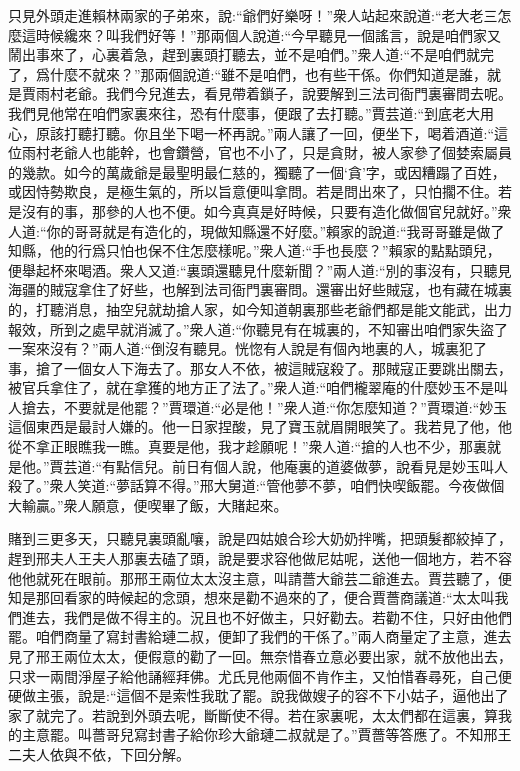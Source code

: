 \begin{parag}
    只見外頭走進賴林兩家的子弟來，說:“爺們好樂呀！”衆人站起來說道:“老大老三怎麼這時候纔來？叫我們好等！”那兩個人說道:“今早聽見一個謠言，說是咱們家又鬧出事來了，心裏着急，趕到裏頭打聽去，並不是咱們。”衆人道:“不是咱們就完了，爲什麼不就來？”那兩個說道:“雖不是咱們，也有些干係。你們知道是誰，就是賈雨村老爺。我們今兒進去，看見帶着鎖子，說要解到三法司衙門裏審問去呢。我們見他常在咱們家裏來往，恐有什麼事，便跟了去打聽。”賈芸道:“到底老大用心，原該打聽打聽。你且坐下喝一杯再說。”兩人讓了一回，便坐下，喝着酒道:“這位雨村老爺人也能幹，也會鑽營，官也不小了，只是貪財，被人家參了個婪索屬員的幾款。如今的萬歲爺是最聖明最仁慈的，獨聽了一個‘貪’字，或因糟蹋了百姓，或因恃勢欺良，是極生氣的，所以旨意便叫拿問。若是問出來了，只怕擱不住。若是沒有的事，那參的人也不便。如今真真是好時候，只要有造化做個官兒就好。”衆人道:“你的哥哥就是有造化的，現做知縣還不好麼。”賴家的說道:“我哥哥雖是做了知縣，他的行爲只怕也保不住怎麼樣呢。”衆人道:“手也長麼？”賴家的點點頭兒，便舉起杯來喝酒。衆人又道:“裏頭還聽見什麼新聞？”兩人道:“別的事沒有，只聽見海疆的賊寇拿住了好些，也解到法司衙門裏審問。還審出好些賊寇，也有藏在城裏的，打聽消息，抽空兒就劫搶人家，如今知道朝裏那些老爺們都是能文能武，出力報效，所到之處早就消滅了。”衆人道:“你聽見有在城裏的，不知審出咱們家失盜了一案來沒有？”兩人道:“倒沒有聽見。恍惚有人說是有個內地裏的人，城裏犯了事，搶了一個女人下海去了。那女人不依，被這賊寇殺了。那賊寇正要跳出關去，被官兵拿住了，就在拿獲的地方正了法了。”衆人道:“咱們櫳翠庵的什麼妙玉不是叫人搶去，不要就是他罷？”賈環道:“必是他！”衆人道:“你怎麼知道？”賈環道:“妙玉這個東西是最討人嫌的。他一日家捏酸，見了寶玉就眉開眼笑了。我若見了他，他從不拿正眼瞧我一瞧。真要是他，我才趁願呢！”衆人道:“搶的人也不少，那裏就是他。”賈芸道:“有點信兒。前日有個人說，他庵裏的道婆做夢，說看見是妙玉叫人殺了。”衆人笑道:“夢話算不得。”邢大舅道:“管他夢不夢，咱們快喫飯罷。今夜做個大輸贏。”衆人願意，便喫畢了飯，大賭起來。
\end{parag}


\begin{parag}
    賭到三更多天，只聽見裏頭亂嚷，說是四姑娘合珍大奶奶拌嘴，把頭髮都絞掉了，趕到邢夫人王夫人那裏去磕了頭，說是要求容他做尼姑呢，送他一個地方，若不容他他就死在眼前。那邢王兩位太太沒主意，叫請薔大爺芸二爺進去。賈芸聽了，便知是那回看家的時候起的念頭，想來是勸不過來的了，便合賈薔商議道:“太太叫我們進去，我們是做不得主的。況且也不好做主，只好勸去。若勸不住，只好由他們罷。咱們商量了寫封書給璉二叔，便卸了我們的干係了。”兩人商量定了主意，進去見了邢王兩位太太，便假意的勸了一回。無奈惜春立意必要出家，就不放他出去，只求一兩間淨屋子給他誦經拜佛。尤氏見他兩個不肯作主，又怕惜春尋死，自己便硬做主張，說是:“這個不是索性我耽了罷。說我做嫂子的容不下小姑子，逼他出了家了就完了。若說到外頭去呢，斷斷使不得。若在家裏呢，太太們都在這裏，算我的主意罷。叫薔哥兒寫封書子給你珍大爺璉二叔就是了。”賈薔等答應了。不知邢王二夫人依與不依，下回分解。
\end{parag}